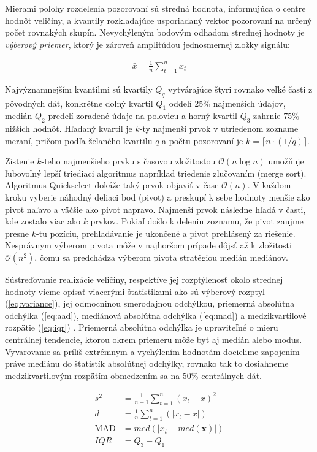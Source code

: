 Mierami polohy rozdelenia pozorovaní sú stredná hodnota, informujúca
o centre hodnôt veličiny, a kvantily rozkladajúce usporiadaný vektor pozorovaní na určený počet rovnakých skupín.
Nevychýleným bodovým odhadom strednej hodnoty je \emph{výberový priemer}, ktorý je zároveň amplitúdou jednosmernej zložky signálu:
\begin{ceqn}\begin{align}
\bar{x} = \frac{1}{n} \sum_{t = 1}^{n}{x_t}
\end{align}\end{ceqn}

Najvýznamnejším kvantilmi sú kvartily $Q_q$ vytvárajúce štyri rovnako veľké časti z pôvodných dát, konkrétne dolný kvartil $Q_1$
oddelí  25\% najmenších údajov, medián $Q_2$ predelí zoradené údaje na polovicu a horný kvartil $Q_3$ zahrnie 75\% nižších hodnôt.
Hľadaný kvartil je $k$-ty najmenší prvok v utriedenom zozname meraní, pričom podľa želaného kvartilu $q$ a počtu pozorovaní je
$k = \lceil n \cdot (1 / q) \rceil$.

Zistenie $k$-teho najmenšieho prvku s časovou zložitosťou $\mathcal{O}(n \log n)$ umožňuje ľubovoľný lepší triediaci algoritmus
napríklad triedenie zlučovaním (merge sort). Algoritmus Quickselect dokáže taký prvok objaviť v čase $\mathcal{O}(n)$.
V každom kroku vyberie náhodný deliaci bod (pivot) a preskupí k sebe hodnoty menšie ako pivot naľavo a väčšie ako pivot
napravo. Najmenší prvok následne hľadá v časti, kde zostalo viac ako $k$ prvkov. Pokiaľ došlo k deleniu zoznamu, že pivot
zaujme presne $k$-tu pozíciu, prehľadávanie je ukončené a pivot prehlásený za riešenie. Nesprávnym výberom pivota môže
v najhoršom prípade dôjsť až k zložitosti $\mathcal{O}(n^2)$, čomu sa predchádza výberom pivota stratégiou medián mediánov.

Sústreďovanie realizácie veličiny, respektíve jej rozptýlenosť okolo strednej hodnoty vieme opísať viacerými štatistikami
ako sú výberový rozptyl (\ref{eq:variance}), jej odmocninou smerodajnou odchýlkou,
priemerná absolútna odchýlka (\ref{eq:aad}), mediánová absolútna odchýlka (\ref{eq:mad})
a medzikvartilové rozpätie (\ref{eq:iqr}) \cite{zaklady-statistiky}. Priemerná absolútna odchýlka je
upraviteľné o mieru centrálnej tendencie, ktorou okrem priemeru môže byť aj medián alebo modus. Vyvarovanie sa
príliš extrémnym a vychýlením hodnotám docielime zapojením práve mediánu do štatistík absolútnej odchýlky, rovnako
tak to dosiahneme medzikvartilovým rozpätím obmedzením sa na 50\% centrálnych dát.
\begin{ceqn}\begin{align}
	s^2 &= \frac{1}{n - 1} \sum_{t = 1}^{n}{(x_t - \bar{x})^2} \label{eq:variance} \\
	d &= \frac{1}{n} \sum_{t = 1}^{n}(|x_t - \bar{x}|) \label{eq:aad} \\
	\mathrm{MAD} &= med(|x_t - med(\mathbf{x})|) \label{eq:mad} \\
	IQR &= Q_3 - Q_1 \label{eq:iqr}
\end{align}\end{ceqn}

